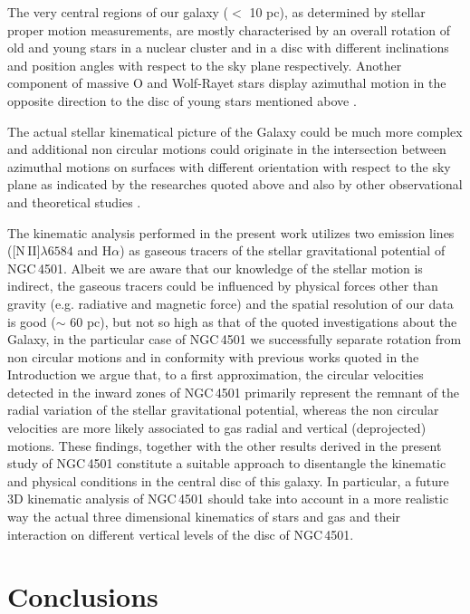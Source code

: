 \documentclass[fleqn,usenatbib]{mnras}
\begin{document}
The very central regions of our galaxy ($<$ 10 pc), as determined by stellar proper motion measurements, are mostly characterised 
by an overall rotation of old and young stars in a nuclear cluster and in a disc with different inclinations and 
position angles with respect to the sky plane respectively. Another component of massive O and Wolf-Rayet stars display azimuthal motion in 
the opposite direction to the disc of young stars mentioned above \citep{Trippe2008, Schodel2009, Paumard2006, Lu2009}.

The actual stellar kinematical picture of the Galaxy could be much more complex and additional non circular motions could originate in the 
intersection between azimuthal motions on surfaces with different orientation with respect to the sky plane as indicated by the researches 
quoted above and also by other observational and theoretical studies \citep{Bartko2009, Kocsis2011}. 

The kinematic analysis performed in the present work utilizes two emission 
lines (\hbox{[N\,II]$\lambda6584$} and H$\alpha$) as gaseous tracers of the stellar gravitational potential of NGC\,4501. Albeit we are aware that 
our knowledge of the stellar motion is indirect, the gaseous tracers could be influenced by physical forces other than gravity (e.g. radiative 
and magnetic force) and the spatial resolution of our data is good ($\sim$ 60 pc), but not so high as that of the quoted investigations about the Galaxy, 
in the particular case of NGC\,4501 we successfully separate rotation from non circular motions and in conformity with previous works quoted in the Introduction 
we argue that, to a first approximation, the circular velocities detected in the inward zones of NGC\,4501 primarily represent the remnant of the radial variation 
of the stellar gravitational potential, whereas the non circular velocities are more likely associated to gas radial and vertical (deprojected) motions. These 
findings, together with the other results derived in the present study of NGC\,4501 constitute a suitable approach to disentangle the kinematic and physical conditions 
in the central disc of this galaxy. In particular, a future 3D kinematic analysis of NGC\,4501 should take into account in a more realistic way the actual three 
dimensional kinematics of stars and gas and their interaction on different vertical levels of the disc of NGC\,4501.  

\section{Conclusions}\label{sec:s10}
\end{document}
